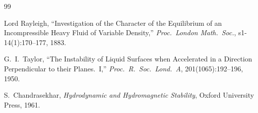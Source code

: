 \documentclass[11pt,a4paper]{article}
\begin{document}
\begin{thebibliography}{99}

Lord Rayleigh,
``Investigation of the Character of the Equilibrium of an Incompressible Heavy
Fluid of Variable Density,''
\textit{Proc.~London Math.~Soc.}, s1-14(1):170--177, 1883.

G.~I.~Taylor,
``The Instability of Liquid Surfaces when Accelerated in a Direction
Perpendicular to their Planes.~I,''
\textit{Proc.~R.~Soc.~Lond.~A}, 201(1065):192--196, 1950.

S.~Chandrasekhar,
\textit{Hydrodynamic and Hydromagnetic Stability},
Oxford University Press, 1961.

\end{thebibliography}
\end{document}
